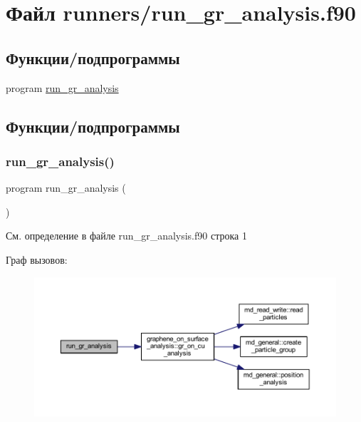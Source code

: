 \hypertarget{run__gr__analysis_8f90}{}\section{Файл runners/run\+\_\+gr\+\_\+analysis.f90}
\label{run__gr__analysis_8f90}
\subsection*{Функции/подпрограммы}
\begin{DoxyCompactItemize}
\item 
program \mbox{\hyperlink{run__gr__analysis_8f90_a0eca5243bc06f4270ed032524f69b5ea}{run\+\_\+gr\+\_\+analysis}}
\end{DoxyCompactItemize}


\subsection{Функции/подпрограммы}
\mbox{\label{run__gr__analysis_8f90_a0eca5243bc06f4270ed032524f69b5ea}} 
\subsubsection{\texorpdfstring{run\+\_\+gr\+\_\+analysis()}{run\_gr\_analysis()}}
{\footnotesize\ttfamily program run\+\_\+gr\+\_\+analysis (\begin{DoxyParamCaption}{ }\end{DoxyParamCaption})}



См. определение в файле run\+\_\+gr\+\_\+analysis.\+f90 строка 1

Граф вызовов\+:\nopagebreak
\begin{figure}[H]
\begin{center}
\leavevmode
\includegraphics[width=350pt]{run__gr__analysis_8f90_a0eca5243bc06f4270ed032524f69b5ea_cgraph}
\end{center}
\end{figure}
